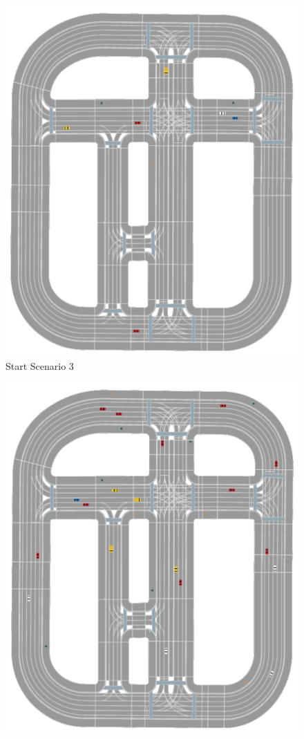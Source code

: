 \begin{figure}[ht] 
	\centering
	\begin{minipage}[b]{0.5\linewidth}
		\centering
		\includegraphics[width=1\linewidth]{figures/start_scenarios/scenario_3} 
		Start Scenario 3
	\end{minipage}%
	\begin{minipage}[b]{0.5\linewidth}
		\centering
		\includegraphics[width=1\linewidth]{figures/start_scenarios/scenario_4} 

\end{minipage}
\end{figure}
